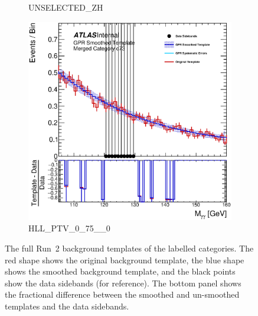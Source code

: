 \begin{figure}
\begin{center}
\begin{subfigure}[T]{0.49\linewidth}
	\caption{UNSELECTED\_ZH}
\end{subfigure}
\begin{subfigure}[T]{0.49\linewidth}
	\centering
	\includegraphics[width=\linewidth]{figures/background/gpr/coupCatTemplates/GPR_Smoothed_Plot_hmgg_c73.eps}
	\caption{HLL\_PTV\_0\_75\_\_0}
\end{subfigure}
\caption{The full Run~2 background templates of the labelled categories. The red shape shows the original background template, the blue shape shows the smoothed background template, and the black points show the data sidebands (for reference). The bottom panel shows the fractional difference between the smoothed and un-smoothed templates and the data sidebands. }
 \label{fig:gpr_coupcat_18}
 \end{center}
\end{figure}

